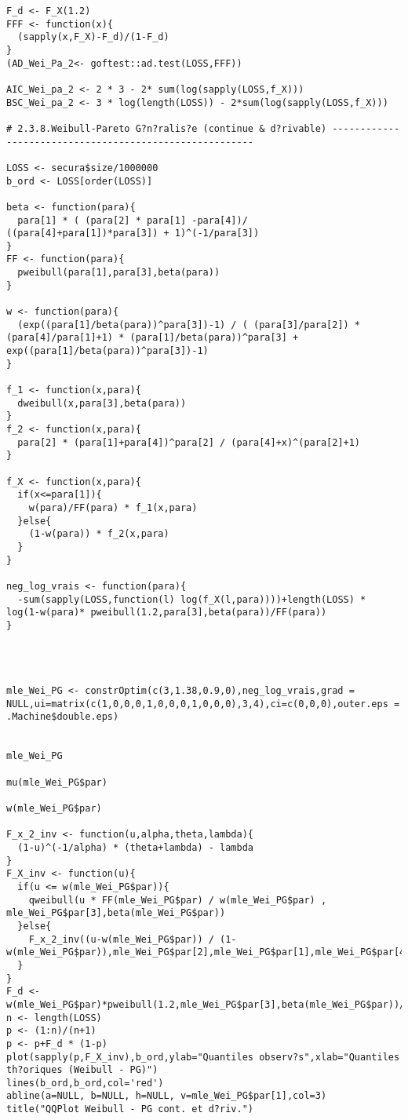 \begin{verbatim}
F_d <- F_X(1.2)
FFF <- function(x){
  (sapply(x,F_X)-F_d)/(1-F_d)
}
(AD_Wei_Pa_2<- goftest::ad.test(LOSS,FFF))

AIC_Wei_pa_2 <- 2 * 3 - 2* sum(log(sapply(LOSS,f_X)))
BSC_Wei_pa_2 <- 3 * log(length(LOSS)) - 2*sum(log(sapply(LOSS,f_X)))

# 2.3.8.Weibull-Pareto G?n?ralis?e (continue & d?rivable) --------------------------------------------------------

LOSS <- secura$size/1000000
b_ord <- LOSS[order(LOSS)]

beta <- function(para){
  para[1] * ( (para[2] * para[1] -para[4])/ ((para[4]+para[1])*para[3]) + 1)^(-1/para[3])
}
FF <- function(para){
  pweibull(para[1],para[3],beta(para))
}

w <- function(para){
  (exp((para[1]/beta(para))^para[3])-1) / ( (para[3]/para[2]) * (para[4]/para[1]+1) * (para[1]/beta(para))^para[3] +  exp((para[1]/beta(para))^para[3])-1) 
}

f_1 <- function(x,para){
  dweibull(x,para[3],beta(para))
}
f_2 <- function(x,para){
  para[2] * (para[1]+para[4])^para[2] / (para[4]+x)^(para[2]+1)
}

f_X <- function(x,para){
  if(x<=para[1]){
    w(para)/FF(para) * f_1(x,para)
  }else{
    (1-w(para)) * f_2(x,para)
  } 
}

neg_log_vrais <- function(para){
  -sum(sapply(LOSS,function(l) log(f_X(l,para))))+length(LOSS) * log(1-w(para)* pweibull(1.2,para[3],beta(para))/FF(para))
}




mle_Wei_PG <- constrOptim(c(3,1.38,0.9,0),neg_log_vrais,grad = NULL,ui=matrix(c(1,0,0,0,1,0,0,0,1,0,0,0),3,4),ci=c(0,0,0),outer.eps = .Machine$double.eps)


mle_Wei_PG

mu(mle_Wei_PG$par)

w(mle_Wei_PG$par)

F_x_2_inv <- function(u,alpha,theta,lambda){
  (1-u)^(-1/alpha) * (theta+lambda) - lambda
}
F_X_inv <- function(u){
  if(u <= w(mle_Wei_PG$par)){
    qweibull(u * FF(mle_Wei_PG$par) / w(mle_Wei_PG$par) , mle_Wei_PG$par[3],beta(mle_Wei_PG$par))
  }else{
    F_x_2_inv((u-w(mle_Wei_PG$par)) / (1-w(mle_Wei_PG$par)),mle_Wei_PG$par[2],mle_Wei_PG$par[1],mle_Wei_PG$par[4])
  }
}
F_d <- w(mle_Wei_PG$par)*pweibull(1.2,mle_Wei_PG$par[3],beta(mle_Wei_PG$par))/FF(mle_Wei_PG$par)
n <- length(LOSS)
p <- (1:n)/(n+1)
p <- p+F_d * (1-p)
plot(sapply(p,F_X_inv),b_ord,ylab="Quantiles observ?s",xlab="Quantiles th?oriques (Weibull - PG)")
lines(b_ord,b_ord,col='red')
abline(a=NULL, b=NULL, h=NULL, v=mle_Wei_PG$par[1],col=3)
title("QQPlot Weibull - PG cont. et d?riv.")


\end{verbatim}
